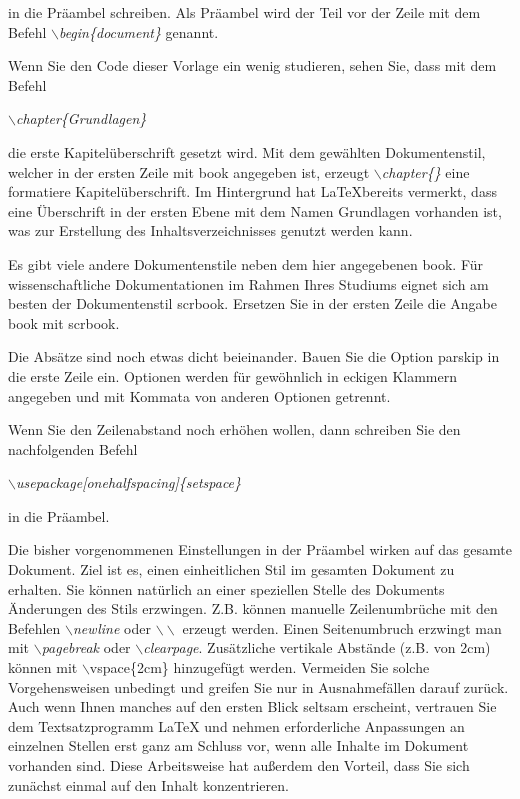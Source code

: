 \documentclass[ngerman,parskip]{scrbook}
\begin{document}
in die Präambel schreiben. Als \glqq Präambel\grqq\; wird der Teil vor der
Zeile mit dem Befehl \textit{$\backslash$begin\{document\}} genannt.

Wenn Sie den Code dieser Vorlage ein wenig studieren, sehen Sie, dass mit dem Befehl

\textit{$\backslash$chapter\{Grundlagen\}}

die erste Kapitelüberschrift gesetzt wird. Mit dem gewählten Dokumentenstil,
welcher in der ersten Zeile mit \glqq book\grqq\; angegeben ist, erzeugt
\textit{$\backslash$chapter\{\}} eine formatiere Kapitelüberschrift. Im
Hintergrund hat \LaTeX bereits vermerkt, dass eine Überschrift in der ersten
Ebene mit dem Namen \glqq Grundlagen\grqq\; vorhanden ist, was zur Erstellung
des Inhaltsverzeichnisses genutzt werden kann.

Es gibt viele andere Dokumentenstile neben dem hier angegebenen \glqq
book\grqq. Für wissenschaftliche Dokumentationen im Rahmen Ihres Studiums
eignet sich am besten der Dokumentenstil \glqq scrbook\grqq\;. Ersetzen Sie in
der ersten Zeile die Angabe \glqq book\grqq\; mit \glqq scrbook\grqq.

Die Absätze sind noch etwas dicht beieinander. Bauen Sie die Option \glqq
parskip\grqq\; in die erste Zeile ein. Optionen werden für gewöhnlich in
eckigen Klammern angegeben und mit Kommata von anderen Optionen getrennt.

Wenn Sie den Zeilenabstand noch erhöhen wollen, dann schreiben Sie den nachfolgenden Befehl

\textit{$\backslash$usepackage[onehalfspacing]\{setspace\}}

in die Präambel.

Die bisher vorgenommenen Einstellungen in der Präambel wirken auf das gesamte
Dokument. Ziel ist es, einen einheitlichen Stil im gesamten Dokument zu
erhalten. Sie können natürlich an einer speziellen Stelle des Dokuments
Änderungen des Stils erzwingen. Z.B. können manuelle Zeilenumbrüche mit den
Befehlen \textit{$\backslash$newline} oder $\backslash\backslash$ erzeugt
werden. Einen Seitenumbruch erzwingt man mit \textit{$\backslash$pagebreak}
oder \textit{$\backslash$clearpage}. Zusätzliche vertikale Abstände (z.B. von
2\;cm) können mit $\backslash$vspace\{2cm\} hinzugefügt werden. Vermeiden Sie
solche Vorgehensweisen unbedingt und greifen Sie nur in Ausnahmefällen darauf
zurück. Auch wenn Ihnen manches auf den ersten Blick seltsam erscheint,
vertrauen Sie dem Textsatzprogramm \LaTeX\; und nehmen erforderliche
Anpassungen an einzelnen Stellen erst ganz am Schluss vor, wenn alle Inhalte im
Dokument vorhanden sind. Diese Arbeitsweise hat außerdem den Vorteil, dass Sie
sich zunächst einmal auf den Inhalt konzentrieren.
\end{document}
